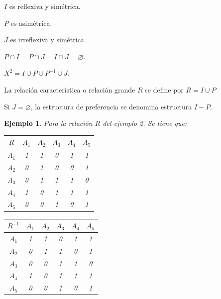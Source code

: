 \documentclass[a5paper,doc,10pt,noapacite]{apa6}
\newtheorem{ejem}{Ejemplo}
\begin{document}
{{\vspace{1\baselineskip}
\begin{APAenumerate}
    \item \(I\) es reflexiva y simétrica.
    \item \(P\) es asimétrica.
    \item \(J\) es irreflexiva y simétrica.
    \item \(P \cap I = P \cap J = I \cap J = \varnothing\).
    \item \(X^2 = I \cup P \cup P^{-1} \cup J\). 
    \item La relación característica o relación grande \(R\) se define por \(R = I \cup P\)
\end{APAenumerate}

\vspace{1\baselineskip}
Si \(J = \varnothing\), la estructura de preferencia se denomina estructura \(I-P\).

\newpage

\begin{ejem}
Para la relación \(R\) del ejemplo 2. Se tiene que:

\begin{table}[H]
	\fontsize{7}{11}\selectfont
    \begin{minipage}{.5\linewidth}
      \centering
	\begin{tabular}{c|ccccc} \thickline
	\(R\) & \(A_1\) & \(A_2\) & \(A_3\) & \(A_4\) & \(A_5\)  \\ \hline
    \(A_1\) & 1 & 1 & 0 & 1 & 1  \\
    \(A_2\) & 0 & 1 & 0 & 0 & 1  \\
	\(A_3\) & 0 & 1 & 1 & 1 & 0   \\
	\(A_4\) & 1 & 0 & 1 & 1 & 1   \\
	\(A_5\) & 0 & 0 & 1 & 0 & 1   \\
\end{tabular}
\label{tab:B2} 
    \end{minipage}%
    \begin{minipage}{.5\linewidth}
      \centering
	\begin{tabular}{c|ccccc} \thickline
	\(R^{-1}\) & \(A_1\) & \(A_2\) & \(A_3\) & \(A_4\) & \(A_5\)  \\ \hline
    \(A_1\) & 1 & 1 & 0 & 1 & 1  \\
    \(A_2\) & 0 & 1 & 1 & 0 & 1  \\
	\(A_3\) & 0 & 0 & 1 & 1 & 0   \\
	\(A_4\) & 1 & 0 & 1 & 1 & 1   \\
	\(A_5\) & 0 & 0 & 1 & 0 & 1   \\
\end{tabular}
\label{tab:B3}
    \end{minipage} 
\end{table}
%


\end{ejem}}}
\end{document}
